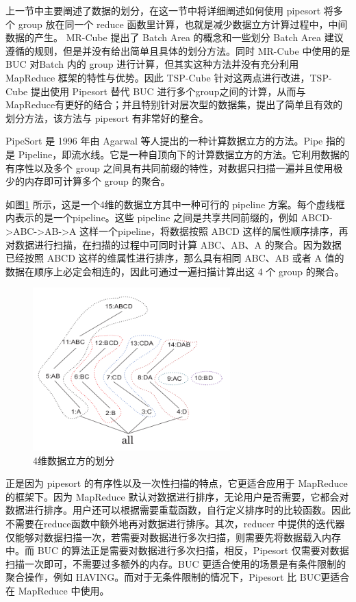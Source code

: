 上一节中主要阐述了数据的划分，在这一节中将详细阐述如何使用 pipesort 将多个 group 放在同一个 reduce 函数里计算，也就是减少数据立方计算过程中，中间数据的产生。 MR-Cube 提出了 Batch Area 的概念和一些划分 Batch Area 建议遵循的规则，但是并没有给出简单且具体的划分方法。同时 MR-Cube 中使用的是 BUC 对Batch 内的 group 进行计算，但其实这种方法并没有充分利用 MapReduce 框架的特性与优势。因此 TSP-Cube 针对这两点进行改进，TSP-Cube 提出使用 Pipesort 替代 BUC 进行多个group之间的计算，从而与MapReduce有更好的结合；并且特别针对层次型的数据集，提出了简单且有效的划分方法，该方法与 pipesort 有非常好的整合。

PipeSort\cite{agarwal1996computation} 是 1996 年由 Agarwal 等人提出的一种计算数据立方的方法。Pipe 指的是 Pipeline，即流水线。它是一种自顶向下的计算数据立方的方法。它利用数据的有序性以及多个 group 之间具有共同前缀的特性，对数据只扫描一遍并且使用极少的内存即可计算多个 group 的聚合。

如图\ref{pipesort} 所示，这是一个4维的数据立方其中一种可行的 pipeline 方案。每个虚线框内表示的是一个pipeline。这些 pipeline 之间是共享共同前缀的，例如 ABCD-\textgreater ABC-\textgreater AB-\textgreater A 这样一个pipeline，将数据按照 ABCD 这样的属性顺序排序，再对数据进行扫描，在扫描的过程中可同时计算 ABC、AB、A 的聚合。因为数据已经按照 ABCD 这样的维属性进行排序，那么具有相同 ABC、AB 或者 A 值的数据在顺序上必定会相连的，因此可通过一遍扫描计算出这 4 个 group 的聚合。

\begin{figure}[!htb]
\centering\includegraphics[width=3in]{picture/ch_terasort_mr/pipesort} 
\caption{4维数据立方的划分}\label{pipesort} 
\end{figure} 

正是因为 pipesort 的有序性以及一次性扫描的特点，它更适合应用于 MapReduce 的框架下。因为 MapReduce 默认对数据进行排序，无论用户是否需要，它都会对数据进行排序。用户还可以根据需要重载函数，自行定义排序时的比较函数。因此不需要在reduce函数中额外地再对数据进行排序。其次，reducer 中提供的迭代器仅能够对数据扫描一次，若需要对数据进行多次扫描，则需要先将数据载入内存中。而 BUC 的算法正是需要对数据进行多次扫描，相反，Pipesort 仅需要对数据扫描一次即可，不需要过多额外的内存。BUC 更适合使用的场景是有条件限制的聚合操作，例如 HAVING。而对于无条件限制的情况下，Pipesort 比 BUC更适合在 MapReduce 中使用。

